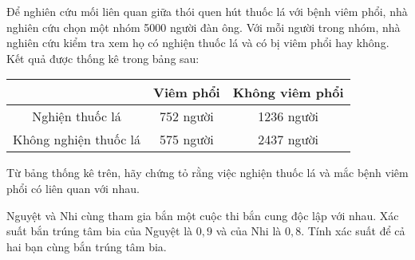 \begin{vd}
	Để nghiên cứu mối liên quan giữa thói quen hút thuốc lá với bệnh viêm phổi, nhà nghiên cứu chọn một nhóm 5000 người đàn ông. Với mỗi người trong nhóm, nhà nghiên cứu kiểm tra xem họ có nghiện thuốc lá và có bị viêm phổi hay không. Kết quả được thống kê trong bảng sau:
	\begin{center}
	\begin{tabular}{|c|c|c|}
	\hline & Viêm phổi & Không viêm phổi \\
	\hline Nghiện thuốc lá & 752 người & 1236 người \\
	\hline Không nghiện thuốc lá & 575 người & 2437 người \\
	\hline
	\end{tabular}
	\end{center}
	Từ bảng thống kê trên, hãy chứng tỏ rằng việc nghiện thuốc lá và mắc bệnh viêm phổi có liên quan với nhau.
\end{vd}
\begin{vd}
	Nguyệt và Nhi cùng tham gia bắn một cuộc thi bắn cung độc lập với nhau. Xác suất bắn trúng tâm bia của Nguyệt là $0{,}9$ và của Nhi là $0{,}8$. Tính xác suất để cả hai bạn cùng bắn trúng tâm bia.
\end{vd}

